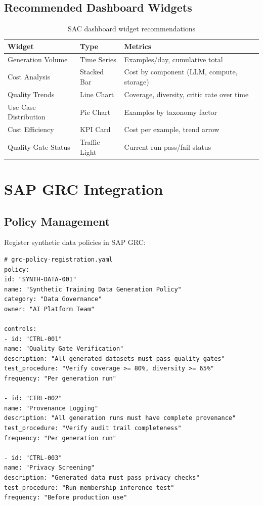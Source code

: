 \documentclass[12pt,a4paper,twoside]{report}
\begin{document}
\subsection{Recommended Dashboard Widgets}

\begin{table}[H]
\centering
\caption{SAC dashboard widget recommendations}
\label{tab:sac-widgets}
\footnotesize
\begin{tabularx}{\textwidth}{@{}l l X@{}}
\toprule
\textbf{Widget} & \textbf{Type} & \textbf{Metrics} \\
\midrule
Generation Volume & Time Series & Examples/day, cumulative total \\
Cost Analysis & Stacked Bar & Cost by component (LLM, compute, storage) \\
Quality Trends & Line Chart & Coverage, diversity, critic rate over time \\
Use Case Distribution & Pie Chart & Examples by taxonomy factor \\
Cost Efficiency & KPI Card & Cost per example, trend arrow \\
Quality Gate Status & Traffic Light & Current run pass/fail status \\
\bottomrule
\end{tabularx}
\end{table}


\section{SAP GRC Integration}

\subsection{Policy Management}

Register synthetic data policies in SAP GRC:

\begin{lstlisting}[language=yamlx,caption={GRC policy registration}]
# grc-policy-registration.yaml
policy:
id: "SYNTH-DATA-001"
name: "Synthetic Training Data Generation Policy"
category: "Data Governance"
owner: "AI Platform Team"

controls:
- id: "CTRL-001"
name: "Quality Gate Verification"
description: "All generated datasets must pass quality gates"
test_procedure: "Verify coverage >= 80%, diversity >= 65%"
frequency: "Per generation run"

- id: "CTRL-002"
name: "Provenance Logging"
description: "All generation runs must have complete provenance"
test_procedure: "Verify audit trail completeness"
frequency: "Per generation run"

- id: "CTRL-003"
name: "Privacy Screening"
description: "Generated data must pass privacy checks"
test_procedure: "Run membership inference test"
frequency: "Before production use"
\end{lstlisting}
\end{document}
